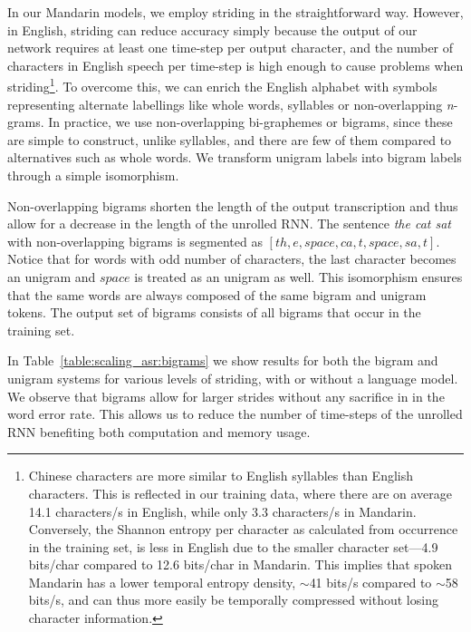 In our Mandarin models, we employ striding in the straightforward way. However,
in English, striding can reduce accuracy simply because the output of our
network requires at least one time-step per output character, and the number of
characters in English speech per time-step is high enough to cause problems
when striding\footnote{Chinese characters are more similar to English syllables
than English characters. This is reflected in our training data, where there
are on average 14.1 characters/s in English, while only 3.3 characters/s in
Mandarin. Conversely, the Shannon entropy per character as calculated from
occurrence in the training set, is less in English due to the smaller character
set---4.9 bits/char compared to 12.6 bits/char in Mandarin. This implies that
spoken Mandarin has a lower temporal entropy density, $\sim$41 bits/s compared
to $\sim$58 bits/s, and can thus more easily be temporally compressed without
losing character information.}. To overcome this, we can enrich the English
alphabet with symbols representing alternate labellings like whole words,
syllables or non-overlapping \emph{n}-grams. In practice, we use
non-overlapping bi-graphemes or bigrams, since these are simple to construct,
unlike syllables, and there are few of them compared to alternatives such as
whole words. We transform unigram labels into bigram labels through a simple
isomorphism.

Non-overlapping bigrams shorten the length of the output transcription and thus
allow for a decrease in the length of the unrolled RNN. The sentence \emph{the
cat sat} with non-overlapping bigrams is segmented as $[th, e, space, ca, t,
space, sa, t ]$. Notice that for words with odd number of characters, the last
character becomes an unigram and $space$ is treated as an unigram as well. This
isomorphism ensures that the same words are always composed of the same bigram
and unigram tokens. The output set of bigrams consists of all bigrams that
occur in the training set. 

In Table~\ref{table:scaling_asr:bigrams} we show results for both the bigram
and unigram systems for various levels of striding, with or without a language
model. We observe that bigrams allow for larger strides without any sacrifice
in in the word error rate. This allows us to reduce the number of time-steps of
the unrolled RNN benefiting both computation and memory usage.

